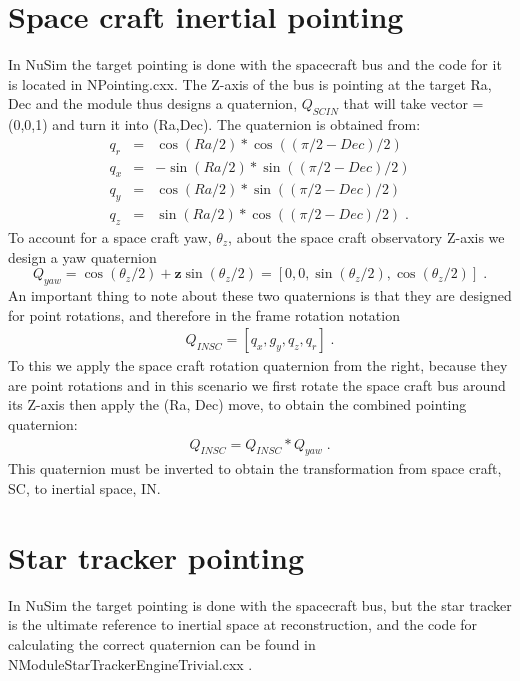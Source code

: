 \section{Space craft inertial pointing}
In NuSim the target pointing is done with the spacecraft bus and the code for it is located in NPointing.cxx. The Z-axis of the bus is pointing at the target Ra, Dec and the module thus designs a quaternion, $Q_{SCIN}$ that will take vector = (0,0,1) and turn it into (Ra,Dec). The quaternion is obtained from:
\begin{eqnarray}
q_r &=& \cos(Ra/2)*\cos((\pi/2-Dec)/2) \\
q_x &=& -\sin(Ra/2)*\sin((\pi/2-Dec)/2) \\
q_y &=& \cos(Ra/2)*\sin((\pi/2-Dec)/2) \\
q_z &=& \sin(Ra/2)*\cos((\pi/2-Dec)/2) \;.
\end{eqnarray}
To account for a space craft yaw, $\theta_z$, about the space craft observatory Z-axis we design a yaw quaternion
\begin{equation}
Q_{yaw} = \cos(\theta_z/2)+\mathbf{z}\sin(\theta_z/2)=[0,0,\sin(\theta_z/2),\cos(\theta_z/2)] \;.
\end{equation}
An important thing to note about these two quaternions is that they are designed for point rotations, and therefore in the frame rotation notation
\begin{eqnarray}
Q_{INSC} = [q_x,g_y,q_z,q_r] \;.
\end{eqnarray}
To this we apply the space craft rotation quaternion from the right, because they are point rotations and in this scenario we first rotate the space craft bus around its Z-axis then apply the (Ra, Dec) move, to obtain the combined pointing quaternion:
\begin{eqnarray}
Q_{INSC} = Q_{INSC} * Q_{yaw}\;.
\end{eqnarray}
This quaternion must be inverted to obtain the transformation from space craft, SC, to inertial space, IN.

\section{Star tracker pointing}
In NuSim the target pointing is done with the spacecraft bus, but the star tracker is the ultimate reference to inertial space at reconstruction, and the code for calculating the correct quaternion can be found in NModuleStarTrackerEngineTrivial.cxx . 

